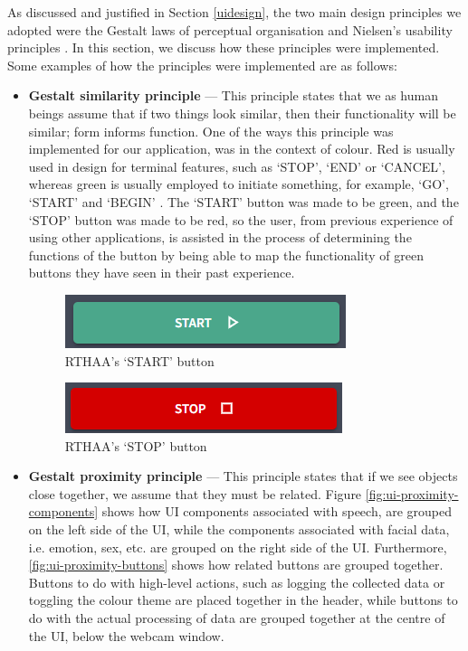 \documentclass[12pt, a4paper]{article}
\begin{document}
As discussed and justified in Section \ref{uidesign}, the two main design principles we adopted were the Gestalt laws of perceptual organisation \citep{todorovic2008gestalt} and Nielsen's usability principles \citep{nielsen1994usability}. In this section, we discuss how these principles were implemented. Some examples of how the principles were implemented are as follows:

\begin{itemize}
    \item \textbf{Gestalt similarity principle} --- This principle states that we as human beings assume that if two things look similar, then their functionality will be similar; form informs function. One of the ways this principle was implemented for our application, was in the context of colour. Red is usually used in design for terminal features, such as `STOP', `END' or `CANCEL', whereas green is usually employed to initiate something, for example, `GO', `START' and `BEGIN' \citep{colley2021exploring}. The `START' button was made to be green, and the `STOP' button was made to be red, so the user, from previous experience of using other applications, is assisted in the process of determining the functions of the button by being able to map the functionality of green buttons they have seen in their past experience. 
    
    \begin{figure}[H]
        \centering
        \includegraphics[scale=1]{images/ui-start.png}
        \caption{RTHAA's `START' button}
        \label{fig:ui-start}
    \end{figure}

    \begin{figure}[H]
        \centering
        \includegraphics[scale=1]{images/ui-stop}
        \caption{RTHAA's `STOP' button}
        \label{fig:ui-stop}
    \end{figure}

    \item \textbf{Gestalt proximity principle} --- This principle states that if we see objects close together, we assume that they must be related. Figure \ref{fig:ui-proximity-components} shows how UI components associated with speech, are grouped on the left side of the UI, while the components associated with facial data, i.e. emotion, sex, etc. are grouped on the right side of the UI. Furthermore, \ref{fig:ui-proximity-buttons} shows how related buttons are grouped together. Buttons to do with high-level actions, such as logging the collected data or toggling the colour theme are placed together in the header, while buttons to do with the actual processing of data are grouped together at the centre of the UI, below the webcam window.
    

\end{itemize}
\end{document}

